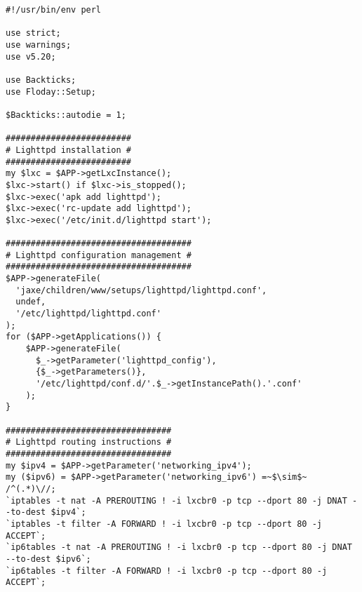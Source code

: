 \begin{lstlisting}[caption={Exemple de script de setup}, label=fig_1.3_setup]
#!/usr/bin/env perl

use strict;
use warnings;
use v5.20;

use Backticks;
use Floday::Setup;

$Backticks::autodie = 1;

#########################
# Lighttpd installation #
#########################
my $lxc = $APP->getLxcInstance();
$lxc->start() if $lxc->is_stopped();
$lxc->exec('apk add lighttpd');
$lxc->exec('rc-update add lighttpd');
$lxc->exec('/etc/init.d/lighttpd start');

#####################################
# Lighttpd configuration management #
#####################################
$APP->generateFile(
  'jaxe/children/www/setups/lighttpd/lighttpd.conf',
  undef,
  '/etc/lighttpd/lighttpd.conf'
);
for ($APP->getApplications()) {
	$APP->generateFile(
	  $_->getParameter('lighttpd_config'),
	  {$_->getParameters()},
	  '/etc/lighttpd/conf.d/'.$_->getInstancePath().'.conf'
	);
}

#################################
# Lighttpd routing instructions #
#################################
my $ipv4 = $APP->getParameter('networking_ipv4');
my ($ipv6) = $APP->getParameter('networking_ipv6') =~$\sim$~ /^(.*)\//;
`iptables -t nat -A PREROUTING ! -i lxcbr0 -p tcp --dport 80 -j DNAT --to-dest $ipv4`;
`iptables -t filter -A FORWARD ! -i lxcbr0 -p tcp --dport 80 -j ACCEPT`;
`ip6tables -t nat -A PREROUTING ! -i lxcbr0 -p tcp --dport 80 -j DNAT --to-dest $ipv6`;
`ip6tables -t filter -A FORWARD ! -i lxcbr0 -p tcp --dport 80 -j ACCEPT`;
\end{lstlisting}

